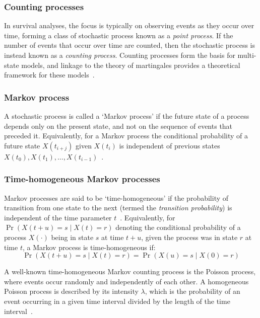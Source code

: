 \subsubsection{Counting processes}

In survival analyses, the focus is typically on observing events as they occur over time, forming a class of stochastic process known as a \textit{point process}. If the number of events that occur over time are counted, then the stochastic process is instead known as a \textit{counting process}. Counting processes form the basis for multi-state models, and linkage to the theory of martingales provides a theoretical framework for these models~\parencite{Andersen1996-xs, Aalen2008-rf}.

\subsubsection{Markov process}

A stochastic process is called a `Markov process' if the future state of a process depends only on the present state, and not on the sequence of events that preceded it. Equivalently, for a Markov process the conditional probability of a future state $X(t_{i+j})$ given $X(t_i)$ is independent of previous states $X(t_0), X(t_1), \dots, X(t_{i-1})$~\parencite{Chiang1980-yt}.

\subsubsection{Time-homogeneous Markov processes}

Markov processes are said to be `time-homogeneous' if the probability of transition from one state to the next (termed the \textit{transition probability}) is independent of the time parameter $t$~\parencite{Chiang1980-yt}. Equivalently, for $\Pr(X(t + u) = s \mid X(t) = r)$ denoting the conditional probability of a process $X(\cdot)$ being in state $s$ at time $t + u$, given the process was in state $r$ at time $t$, a Markov process is time-homogeneous if:
%
\[
    \Pr(X(t+u) = s \mid X(t) = r) = \Pr(X(u) = s \mid X(0) = r)
\]

A well-known time-homogeneous Markov counting process is the Poisson process, where events occur randomly and independently of each other. A homogeneous Poisson process is described by its intensity $\lambda$, which is the probability of an event occurring in a given time interval divided by the length of the time interval~\parencite{Aalen2008-rf}.

